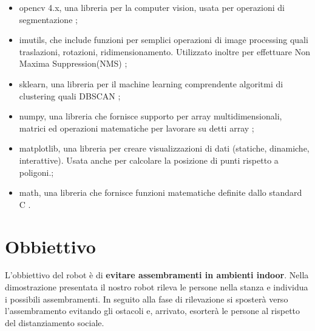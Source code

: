 \documentclass[a4paper]{article}
\begin{document}
	\begin{itemize}
		\item opencv 4.x, una libreria per la computer vision, usata per
			operazioni di segmentazione \cite{opencv};
		\item imutils, che include funzioni per semplici operazioni di image
			processing quali traslazioni, rotazioni, ridimensionamento.
			Utilizzato inoltre per effettuare Non Maxima Suppression(NMS)
			\cite{imutils};
		\item sklearn, una libreria per il machine learning comprendente
			algoritmi di clustering quali DBSCAN \cite{scikit};
		\item numpy, una libreria che fornisce supporto per array
			multidimensionali, matrici ed operazioni matematiche per lavorare
			su detti array \cite{numpy};
		\item matplotlib, una libreria per creare visualizzazioni di dati
			(statiche, dinamiche, interattive). Usata anche per calcolare la
			posizione di punti rispetto a poligoni.\cite{matplotlib}; 
		\item math, una libreria che fornisce funzioni matematiche definite dallo
			standard C \cite{math}.
	\end{itemize}

	\section{Obbiettivo}\label{sec:Obbiettivo} 
	L'obbiettivo del robot è di \textbf{evitare assembramenti in ambienti indoor}. \newline
	Nella dimostrazione presentata il nostro robot rileva le persone nella stanza e individua i possibili assembramenti. In seguito alla fase di rilevazione si sposterà verso l'assembramento evitando gli ostacoli e, arrivato, esorterà le persone al rispetto del distanziamento sociale.
	
\end{document}
